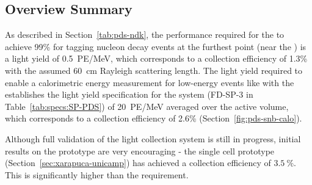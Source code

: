 



\subsection{Overview Summary} 
\label{sec:fdsp-pd-ov-summ}

As described in Section~\ref{tab:pds-ndk}, the performance required for the  to achieve 99\% for tagging nucleon decay events at the furthest point (near the ) is a light yield of \SI{0.5}{PE/MeV}, which corresponds to a collection efficiency of 1.3\% with the assumed \SI{60}{cm} Rayleigh scattering length. The light yield required to enable a calorimetric energy measurement for low-energy events like  with the  establishes the light yield specification for the system (FD-SP-3 in Table~\ref{tab:specs:SP-PDS}) of \SI{20}{PE/MeV} averaged over the active volume, which corresponds to a collection efficiency of 2.6\% (Section~\ref{fig:pds-snb-calo}).

Although full validation of the   light collection system is still in progress, initial results on the  prototype are very encouraging - the single cell prototype (Section~\ref{sec:xarapuca-unicamp}) has achieved a collection efficiency of $\SI{3.5}{\%}$.  This is significantly higher than the requirement.

